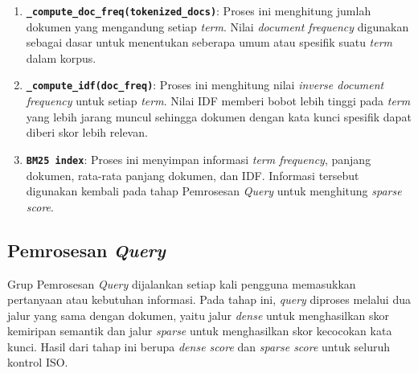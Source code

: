 \documentclass[12pt,a4paper]{article}
\begin{document}
\begin{enumerate}[label=\alph*., leftmargin=1.1cm]
\item \textbf{\texttt{\_compute\_doc\_freq(tokenized\_docs)}}: Proses ini menghitung jumlah dokumen yang mengandung setiap \textit{term}. Nilai \textit{document frequency} digunakan sebagai dasar untuk menentukan seberapa umum atau spesifik suatu \textit{term} dalam korpus.

\item \textbf{\texttt{\_compute\_idf(doc\_freq)}}: Proses ini menghitung nilai \textit{inverse document frequency} untuk setiap \textit{term}. Nilai IDF memberi bobot lebih tinggi pada \textit{term} yang lebih jarang muncul sehingga dokumen dengan kata kunci spesifik dapat diberi skor lebih relevan.

\item \textbf{\texttt{BM25 index}}: Proses ini menyimpan informasi \textit{term frequency}, panjang dokumen, rata-rata panjang dokumen, dan IDF. Informasi tersebut digunakan kembali pada tahap Pemrosesan \textit{Query} untuk menghitung \textit{sparse score}.
\end{enumerate}

\subsection*{Pemrosesan \textit{Query}}

Grup Pemrosesan \textit{Query} dijalankan setiap kali pengguna memasukkan pertanyaan atau kebutuhan informasi. Pada tahap ini, \textit{query} diproses melalui dua jalur yang sama dengan dokumen, yaitu jalur \textit{dense} untuk menghasilkan skor kemiripan semantik dan jalur \textit{sparse} untuk menghasilkan skor kecocokan kata kunci. Hasil dari tahap ini berupa \textit{dense score} dan \textit{sparse score} untuk seluruh kontrol ISO.
\end{document}
